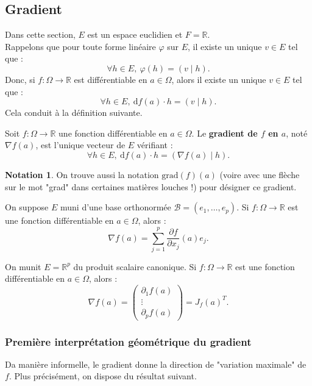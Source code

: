 \documentclass[french]{article}
\newcommand{\R}{\mathbb{R}}
\renewcommand{\d}{\text{d}}
\theoremstyle{plain}
\theoremstyle{definition}
\newtheorem*{notation}{Notation}
\theoremstyle{remark}
\begin{document}
\subsection{Gradient}

Dans cette section, $E$ est un espace euclidien et $F=\R$. \\
Rappelons que pour toute forme linéaire $\varphi$ sur $E$, il existe un unique $v\in E$ tel que : 
$$\forall h\in E,\ \varphi(h)=(v\mid h).$$
Donc, si $f:\Omega\to\R$ est différentiable en $a\in\Omega$, alors il existe un unique $v\in E$ tel que :
$$\forall h\in E,\ \d f(a)\cdot h=(v\mid h).$$
Cela conduit à la définition suivante.

\begin{dfn}
	Soit $f:\Omega\to\R$ une fonction différentiable en $a\in\Omega$. Le \textbf{gradient de $f$ en $a$}, noté $\nabla f(a)$, est l'unique vecteur de $E$ vérifiant : 
	$$\forall h\in E,\ \d f(a)\cdot h=(\nabla f(a)\mid h).$$
\end{dfn}

\begin{notation}
	On trouve aussi la notation $\text{grad}(f)(a)$ (voire avec une flèche sur le mot "grad" dans certaines matières louches !) pour désigner ce gradient.
\end{notation}

\begin{prop}%
	On suppose $E$ muni d'une base orthonormée $\mathcal{B}=(e_1,\ldots,e_p)$. Si $f:\Omega\to\R$ est une fonction différentiable en $a\in\Omega$, alors :
	$$\nabla f(a)=\sum_{j=1}^{p}\frac{\partial f}{\partial x_j}(a)e_j.$$
\end{prop}

\begin{cor}%
	On munit $E=\R^p$ du produit scalaire canonique. Si $f:\Omega\to\R$ est une fonction différentiable en $a\in\Omega$, alors :
	$$\nabla f(a)=\begin{pmatrix}
		\partial_1f(a)\\
		\vdots\\
		\partial_pf(a)
	\end{pmatrix}=J_f(a)^T.$$
\end{cor}

\subsubsection*{Première interprétation géométrique du gradient}

Da manière informelle, le gradient donne la direction de "variation maximale" de $f$. Plus précisément, on dispose du résultat suivant.
\end{document}
